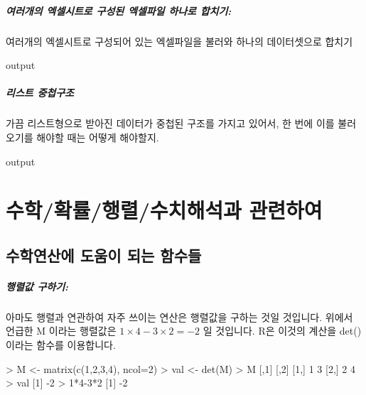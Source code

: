 \documentclass{book}
\begin{document}
\paragraph{여러개의 엑셀시트로 구성된 엑셀파일 하나로 합치기:} 여러개의 엑셀시트로 구성되어 있는 엑셀파일을 불러와 하나의 데이터셋으로 합치기
\begin{Schunk}
\begin{Soutput}
output
\end{Soutput}
\end{Schunk}

\paragraph{리스트 중첩구조} 
가끔 리스트형으로 받아진 데이터가 중첩된 구조를 가지고 있어서, 한 번에 이를 불러오기를 해야할 때는 어떻게 해야할지.
\begin{Schunk}
\begin{Soutput}
output
\end{Soutput}
\end{Schunk}



%
%
%

\chapter{수학/확률/행렬/수치해석과 관련하여}

\section{수학연산에 도움이 되는 함수들}

\paragraph{행렬값 구하기: }  아마도 행렬과 연관하여 자주 쓰이는 연산은 행렬값을 구하는 것일 것입니다. 
위에서 언급한 M 이라는 행렬값은 $1\times 4 - 3\times 2 = -2$ 일 것입니다. 
R은 이것의 계산을 det()이라는 함수를 이용합니다. 

\begin{Schunk}
\begin{Soutput}
> M <- matrix(c(1,2,3,4), ncol=2)
> val <- det(M)
> M
     [,1] [,2]
[1,]    1    3
[2,]    2    4
> val
[1] -2
> 1*4-3*2
[1] -2
\end{Soutput}
\end{Schunk}
\end{document}
